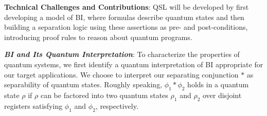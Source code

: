\documentclass[conference,compsoc, 10pt]{IEEEtran}
\newcommand {\sepimp} {\mathrel{-\mkern-6mu*}}
\newcommand{\sd}{\diamond}%
\newcommand {\sdimp} {\mathrel{-\mkern-2.5mu\diamond}}
\begin{document}
	\textbf{Technical Challenges and Contributions}:
  QSL will be developed by first developing a model of BI, where formulas
  describe quantum states and then building a separation logic using these
  assertions as pre- and post-conditions, introducing proof rules to
  reason about quantum programs.
	
	\textbf{\emph{BI and Its Quantum Interpretation}}: To characterize the properties of quantum systems, we first identify a quantum interpretation of BI appropriate for our target applications. %
  We choose to interpret our separating conjunction $\ast$ as separability
  of quantum states. Roughly speaking, $\phi_1\ast\phi_2$ holds in a quantum state $\rho$ if $\rho$ can be factored into two quantum states $\rho_1$ and $\rho_2$ over disjoint registers satisfying $\phi_1$ and $\phi_2$, respectively. 
	
\end{document}

